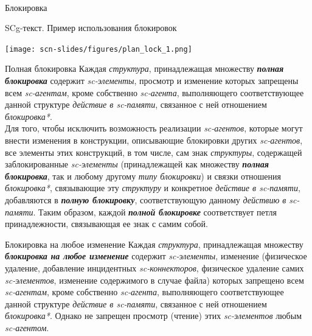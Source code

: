 \begin{frame}{\\Блокировка}
\end{frame}

\begin{frame}{}
    \caption{SCg-текст. Пример использования блокировок}
	\texttt{[image: scn-slides/figures/plan\_lock\_1.png]}
\end{frame}

\begin{frame}{ Полная блокировка}
\vspace{12}
   Каждая \textit{структура}, принадлежащая множеству \textbf{\textit{полная блокировка}} содержит \textit{sc-элементы}, просмотр и изменение которых запрещены всем \textit{sc-агентам}, кроме собственно \textit{sc-агента}, выполняющего соответствующее данной структуре \textit{действие в sc-памяти}, связанное с ней отношением \textit{блокировка*}.
\\Для того, чтобы исключить возможность реализации \textit{sc-агентов}, которые могут внести изменения в конструкции, описывающие блокировки других \textit{sc-агентов}, все элементы этих конструкций, в том числе, сам знак \textit{структуры}, содержащей заблокированные \textit{sc-элементы} (принадлежащей как множеству \textbf{\textit{полная блокировка}}, так и любому другому \textit{типу блокировки}) и связки отношения \textit{блокировка*}, связывающие эту \textit{структуру} и конкретное \textit{действие в sc-памяти}, добавляются в \textbf{\textit{полную блокировку}}, соответствующую данному \textit{действию в sc-памяти}. Таким образом, каждой \textbf{\textit{полной блокировке}} соответствует петля принадлежности, связывающая ее знак с самим собой. 
\end{frame}

\begin{frame}{Блокировка на любое изменение}
  Каждая \textit{структура}, принадлежащая множеству \textbf{\textit{блокировка на любое изменение}} содержит \textit{sc-элементы}, изменение (физическое удаление, добавление инцидентных \textit{sc-коннекторов}, физическое удаление самих \textit{\mbox{sc-элементов}}, изменение содержимого в случае файла) которых запрещено всем \textit{sc-агентам}, кроме собственно \textit{sc-агента}, выполняющего соответствующее данной структуре \textit{действие в sc-памяти}, связанное с ней отношением \textit{блокировка*}. Однако не запрещен просмотр (чтение) этих \textit{sc-элементов} любым \textit{sc-агентом}.  
\end{frame}

